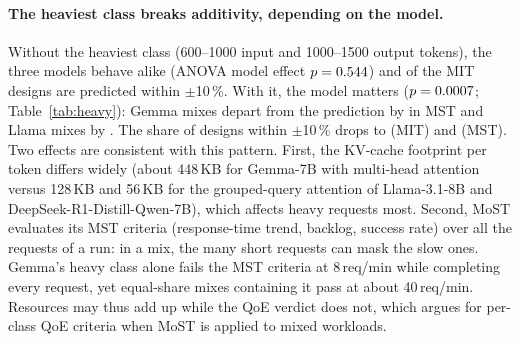 \paragraph{The heaviest class breaks additivity, depending on the model.} Without the heaviest class
(600--1000 input and 1000--1500 output tokens), the three models behave alike (ANOVA model effect
$p=0.544$) and \scaleWithinTenMITLight of the MIT designs are predicted within
$\pm$10\,\%. With it, the model matters ($p=0.0007$; Table~\ref{tab:heavy}): Gemma mixes depart from the
prediction by \scaleHeavyGemmaMST in MST and Llama mixes by \scaleHeavyLlamaMST. The share of
designs within $\pm$10\,\% drops to \scaleWithinTenMITHeavy (MIT) and \scaleWithinTenMSTHeavy (MST).
Two effects are consistent with this pattern. First, the KV-cache footprint per token differs widely
(about 448\,KB for Gemma-7B with multi-head attention versus 128\,KB and 56\,KB for the grouped-query
attention of Llama-3.1-8B and DeepSeek-R1-Distill-Qwen-7B), which affects heavy requests most. Second,
MoST evaluates its MST criteria (response-time trend, backlog, success rate) over all the requests of a
run: in a mix, the many short requests can mask the slow ones. Gemma's heavy class alone fails the MST
criteria at 8\,req/min while completing every request, yet equal-share mixes containing it pass at about
40\,req/min. Resources may thus add up while the QoE verdict does not, which argues for per-class QoE
criteria when MoST is applied to mixed workloads.

\begin{table}[t]
  \centering
  \caption{Combination laws for mix capacity. Errors are log-ratios of measured to predicted capacity
  averaged over the \scaleNDesigns mix designs; the last column is the out-of-sample log predictive
  density relative to the harmonic law ($\pm$ standard error).}
  \label{tab:laws}
  
\end{table}

\begin{table}[t]
  \centering
  \caption{Bias of mix capacity relative to the harmonic prediction, by model and MoST test.}
  \label{tab:bias}
  \resizebox{\textwidth}{!}{}
\end{table}

\begin{table}[t]
  \centering
  \caption{MIT versus MST: the same law with different precision.}
  \label{tab:mitmst}
  
\end{table}

